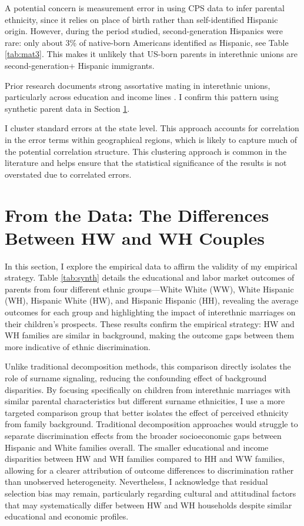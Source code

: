 A potential concern is measurement error in using CPS data to infer parental ethnicity, since it relies on place of birth rather than self-identified Hispanic origin. However, during the period studied, second-generation Hispanics were rare: only about 3\% of native-born Americans identified as Hispanic, see Table \ref{tab:mat3}. This makes it unlikely that US-born parents in interethnic unions are second-generation+ Hispanic immigrants. 

Prior research documents strong assortative mating in interethnic unions, particularly across education and income lines \autocite{beckerTheoryMarriagePart1973, chiapporiFatterAttractionAnthropometric2012, duncanIntermarriageIntergenerationalTransmission2011}. I confirm this pattern using synthetic parent data in Section \ref{sec:hw-wh-couples-data}.

I cluster standard errors at the state level. This approach accounts for correlation in the error terms within geographical regions, which is likely to capture much of the potential correlation structure. This clustering approach is common in the literature and helps ensure that the statistical significance of the results is not overstated due to correlated errors.

\section{From the Data: The Differences Between HW and WH Couples}\label{sec:hw-wh-couples-data}

In this section, I explore the empirical data to affirm the validity of my empirical strategy. Table \ref{tab:synth} details the educational and labor market outcomes of parents from four different ethnic groups—White White (WW), White Hispanic (WH), Hispanic White (HW), and Hispanic Hispanic (HH), revealing the average outcomes for each group and highlighting the impact of interethnic marriages on their children’s prospects. These results confirm the empirical strategy: HW and WH families are similar in background, making the outcome gaps between them more indicative of ethnic discrimination.

Unlike traditional decomposition methods, this comparison directly isolates the role of surname signaling, reducing the confounding effect of background disparities. By focusing specifically on children from interethnic marriages with similar parental characteristics but different surname ethnicities, I use a more targeted comparison group that better isolates the effect of perceived ethnicity from family background. Traditional decomposition approaches would struggle to separate discrimination effects from the broader socioeconomic gaps between Hispanic and White families overall. The smaller educational and income disparities between HW and WH families compared to HH and WW families, allowing for a clearer attribution of outcome differences to discrimination rather than unobserved heterogeneity. Nevertheless, I acknowledge that residual selection bias may remain, particularly regarding cultural and attitudinal factors that may systematically differ between HW and WH households despite similar educational and economic profiles.

